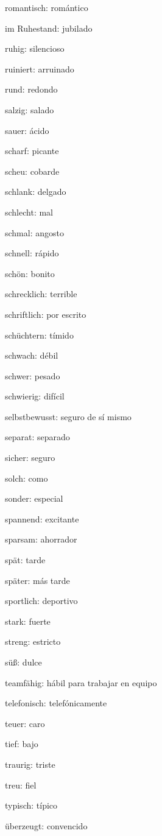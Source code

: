 \begin{multicols}{2}
\begin{myitemize}
\item romantisch: romántico
\item im Ruhestand: jubilado
\item ruhig: silencioso
\item ruiniert: arruinado
\item rund: redondo
\item salzig: salado
\item sauer: ácido
\item scharf: picante
\item scheu: cobarde
\item schlank: delgado
\item schlecht: mal
\item schmal: angosto
\item schnell: rápido
\item schön: bonito
\item schrecklich: terrible
\item schriftlich: por escrito
\item schüchtern: tímido
\item schwach: débil
\item schwer: pesado
\item schwierig: difícil
\item selbstbewusst: seguro de sí mismo
\item separat: separado
\item sicher: seguro
\item solch: como
\item sonder: especial
\item spannend: excitante
\item sparsam: ahorrador
\item spät: tarde
\item später: más tarde
\item sportlich: deportivo
\item stark: fuerte
\item streng: estricto
\item süß: dulce
\item teamfähig: hábil para trabajar en equipo
\item telefonisch: telefónicamente
\item teuer: caro
\item tief: bajo
\item traurig: triste
\item treu: fiel
\item typisch: típico
\item überzeugt: convencido

\end{myitemize}
\end{multicols}

